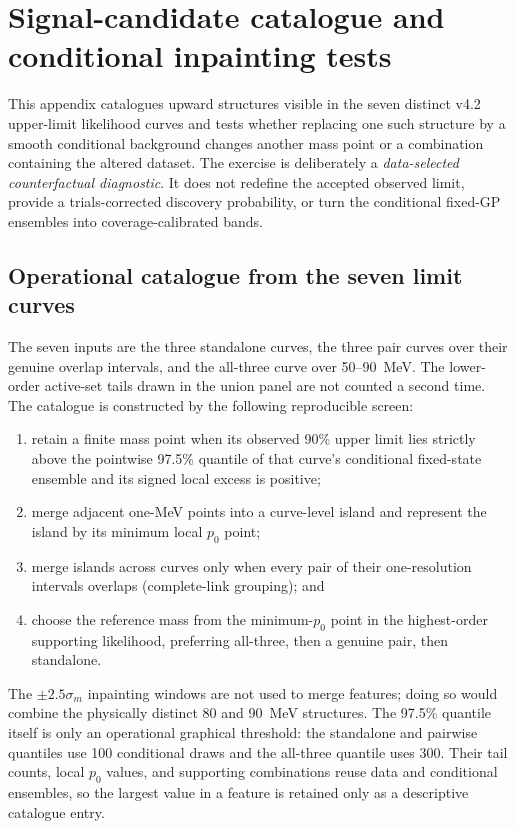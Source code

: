\clearpage
\section{Signal-candidate catalogue and conditional inpainting tests}
\label{app:signal-candidate-catalogue}

This appendix catalogues upward structures visible in the seven distinct
v4.2 upper-limit likelihood curves and tests whether replacing one such
structure by a smooth conditional background changes another mass point or a
combination containing the altered dataset.  The exercise is deliberately a
\emph{data-selected counterfactual diagnostic}.  It does not redefine the
accepted observed limit, provide a trials-corrected discovery probability, or
turn the conditional fixed-GP ensembles into coverage-calibrated bands.

\subsection{Operational catalogue from the seven limit curves}
\label{app:candidate-catalogue-rule}

The seven inputs are the three standalone curves, the three pair curves over
their genuine overlap intervals, and the all-three curve over 50--90~MeV.
The lower-order active-set tails drawn in the union panel are not counted a
second time.  The catalogue is constructed by the following reproducible
screen:

\begin{enumerate}
  \item retain a finite mass point when its observed 90\% \CLs{} upper limit
  lies strictly above the pointwise 97.5\% quantile of that curve's
  conditional fixed-state ensemble and its signed local excess is positive;
  \item merge adjacent one-MeV points into a curve-level island and represent
  the island by its minimum local $p_0$ point;
  \item merge islands across curves only when every pair of their
  one-resolution intervals overlaps (complete-link grouping); and
  \item choose the reference mass from the minimum-$p_0$ point in the
  highest-order supporting likelihood, preferring all-three, then a genuine
  pair, then standalone.
\end{enumerate}

The $\pm2.5\sigma_m$ inpainting windows are not used to merge features; doing
so would combine the physically distinct 80 and 90~MeV structures.  The
97.5\% quantile itself is only an operational graphical threshold: the
standalone and pairwise quantiles use 100 conditional draws and the
all-three quantile uses 300.  Their tail counts, local $p_0$ values, and
supporting combinations reuse data and conditional ensembles, so the largest
value in a feature is retained only as a descriptive catalogue entry.

